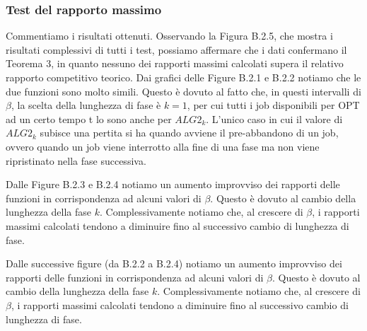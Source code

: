 \documentclass[12pt]{article}
\begin{document}
\subsubsection{Test del rapporto massimo}
Commentiamo i risultati ottenuti. Osservando la Figura B.2.5, che mostra i risultati complessivi di tutti i test, possiamo affermare che i dati confermano il Teorema 3, in quanto nessuno dei rapporti massimi calcolati supera il relativo rapporto competitivo teorico.
Dai grafici delle Figure B.2.1 e B.2.2 notiamo che le due funzioni sono molto simili. Questo è dovuto al fatto che, in questi intervalli di $\beta$, la scelta della lunghezza di fase è $k=1$, per cui tutti i job disponibili per OPT ad un certo tempo t lo sono anche per $ALG2_{k}$. L'unico caso in cui il valore di $ALG2_{k}$ subisce una pertita si ha quando avviene il pre-abbandono di un job, ovvero quando un job viene interrotto alla fine di una fase ma non viene ripristinato nella fase successiva.

Dalle Figure B.2.3 e B.2.4 notiamo un aumento improvviso dei rapporti delle funzioni in corrispondenza ad alcuni valori di $\beta$. Questo è dovuto al cambio della lunghezza della fase $k$. Complessivamente notiamo che, al crescere di $\beta$, i rapporti massimi calcolati tendono a diminuire fino al successivo cambio di lunghezza di fase.

Dalle successive figure (da B.2.2 a B.2.4) notiamo un aumento improvviso dei rapporti delle funzioni in corrispondenza ad alcuni valori di $\beta$. Questo è dovuto al cambio della lunghezza della fase $k$. Complessivamente notiamo che, al crescere di $\beta$, i rapporti massimi calcolati tendono a diminuire fino al successivo cambio di lunghezza di fase.
\end{document}

